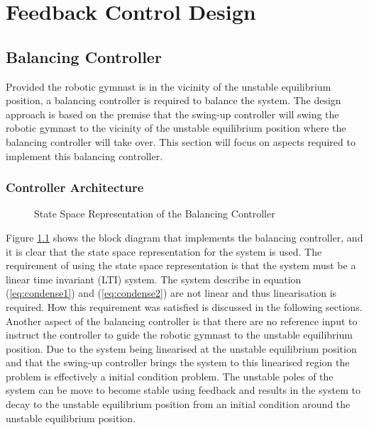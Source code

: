 \chapter{Feedback Control Design}
\label{chp:controller}

\section{Balancing Controller}

Provided the robotic gymnast is in the vicinity of the unstable equilibrium position, a balancing controller is required to balance the system. The design approach is based on the premise that the swing-up controller will swing the robotic gymnast to the vicinity of the unstable equilibrium position where the balancing controller will take over. This section will focus on aspects required to implement this balancing controller.\\


\subsection{Controller Architecture}

\begin{figure}
	\centering
	
	\caption{State Space Representation of the Balancing Controller}
	\label{fig:linearSys2}
\end{figure}

Figure \ref{fig:linearSys2} shows the block diagram that implements the balancing controller, and it is clear that the state space representation for the system is used. The requirement of using the state space representation is that the system must be a linear time invariant (LTI) system. The system describe in equation (\ref{eq:condense1}) and (\ref{eq:condense2}) are not linear and thus linearisation is required. How this requirement was satisfied is discussed in the following sections.\\

Another aspect of the balancing controller is that there are no reference input to instruct the controller to guide the robotic gymnast to the unstable equilibrium position. Due to the system being linearised at the unstable equilibrium position and that the swing-up controller brings the system to this linearised region the problem is effectively a initial condition problem. The unstable poles of the system can be move to become stable using feedback and results in the system to decay to the unstable equilibrium position from an initial condition around the unstable equilibrium position.


